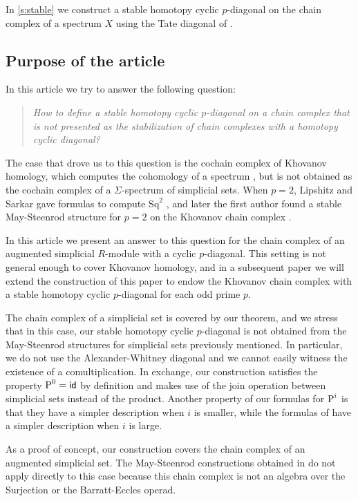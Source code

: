 In \cref{s:stable} we construct a stable homotopy cyclic $p$-diagonal on the chain complex of a spectrum $X$ using the Tate diagonal of \cite{Nikolaus-Scholze}.

 
 \subsection*{Purpose of the article} In this article we try to answer the following question: 
 \begin{quotation}
 	\emph{How to define a stable homotopy cyclic $p$-diagonal on a chain complex that is not presented as the stabilization of chain complexes with a homotopy cyclic diagonal?} 
 \end{quotation}
 The case that drove us to this question is the cochain complex of Khovanov homology, which computes the cohomology of a spectrum \cite{LS14, LLS20}, but is not obtained as the cochain complex of a $\Sigma$-spectrum of simplicial sets. When $p=2$, Lipshitz and Sarkar gave formulas to compute $\mathrm{Sq}^2$ \cite{LS14b}, and later the first author found a stable May-Steenrod structure for $p=2$ on the Khovanov chain complex \cite{cantero-moran2020khovanov}. 
 
  In this article we present an answer to this question for the chain complex of an augmented simplicial $R$-module with a cyclic $p$-diagonal. This setting is not general enough to cover Khovanov homology, and in a subsequent paper we will extend the construction of this paper to endow the Khovanov chain complex with a stable homotopy cyclic $p$-diagonal for each odd prime $p$.
  
The chain complex of a simplicial set is covered by our theorem, and we stress that in this case, our stable homotopy cyclic $p$-diagonal is not obtained from the May-Steenrod structures for simplicial sets previously mentioned. In particular, we do not use the Alexander-Whitney diagonal and we cannot easily witness the existence of a comultiplication. In exchange, our construction satisfies the property $\operatorname{P}^{0}=\mathsf{id}$ by definition and makes use of the join operation between simplicial sets instead of the product. Another property of our formulas for $\operatorname{P}^i$ is that they have a simpler description when $i$ is smaller, while the formulas of \cite{medina2021may_st} have a simpler description when $i$ is large. 

As a proof of concept, our construction covers the chain complex of an augmented simplicial set. The May-Steenrod constructions obtained in \cite{mcclure2003multivariable, berger2004combinatorial, medina2021may_st} do not apply directly to this case because this chain complex is not an algebra over the Surjection or the Barratt-Eccles operad. 

